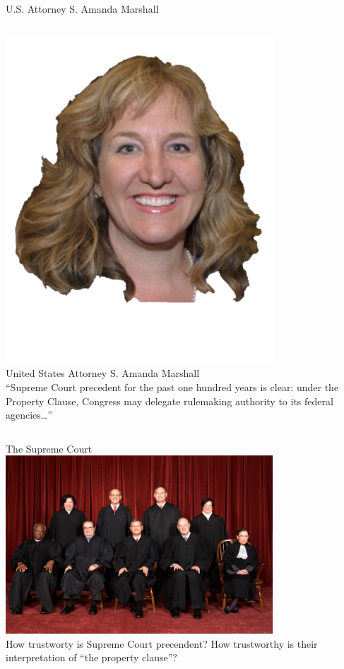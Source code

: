 \documentclass{beamer}
\begin{document}
\begin{frame}{U.S. Attorney S. Amanda Marshall}
    \begin{columns}[onlytextwidth]
            \centering
            \includegraphics[width=0.75\textwidth]{img/amanda-marshall.png} \\
            United States Attorney S. Amanda Marshall \\

            ``Supreme Court precedent for the past one hundred years is clear: under the Property Clause, Congress may delegate rulemaking authority to its federal agencies\ldots''
    \end{columns}
\end{frame}

\begin{frame}{The Supreme Court}
    \centering
    \includegraphics[width=0.75\textwidth]{img/supreme.png} \\
    How trustworty is Supreme Court precendent? How trustworthy is their interpretation of ``the property clause''?
\end{frame}
\end{document}
